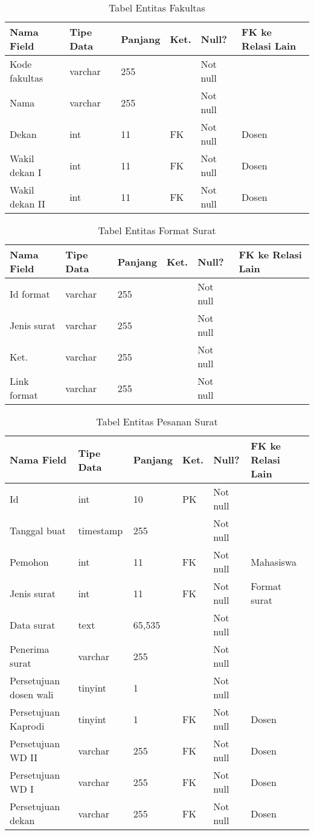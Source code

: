 \begin{table}[H]
\centering
\caption{Tabel Entitas Fakultas}
\label{entitas_fakultas}
\begin{tabular}{|l|l|l|l|l|l|}
\hline
\textbf{Nama Field}&\textbf{Tipe Data}&\textbf{Panjang}&\textbf{Ket.}&\textbf{Null?}&\textbf{FK ke Relasi Lain}\\ \hline
Kode fakultas&varchar&255&&Not null&\\ \hline
Nama&varchar&255&&Not null&\\ \hline
Dekan&int&11&FK&Not null&Dosen\\ \hline
Wakil dekan I&int&11&FK&Not null&Dosen\\ \hline
Wakil dekan II&int&11&FK&Not null&Dosen\\ \hline
\end{tabular}
\end{table}

\begin{table}[H]
\centering
\caption{Tabel Entitas Format Surat}
\label{entitas_format_surat}
\begin{tabular}{|l|l|l|l|l|l|}
\hline
\textbf{Nama Field}&\textbf{Tipe Data}&\textbf{Panjang}&\textbf{Ket.}&\textbf{Null?}&\textbf{FK ke Relasi Lain}\\ \hline
Id format&varchar&255&&Not null&\\ \hline
Jenis surat&varchar&255&&Not null&\\ \hline
Ket.&varchar&255&&Not null&\\ \hline
Link format&varchar&255&&Not null&\\ \hline
\end{tabular}
\end{table}

\begin{table}[H]
\centering
\caption{Tabel Entitas Pesanan Surat}
\label{entitas_pesanan_surat}
\begin{tabular}{|l|l|l|l|l|l|}
\hline
\textbf{Nama Field}&\textbf{Tipe Data}&\textbf{Panjang}&\textbf{Ket.}&\textbf{Null?}&\textbf{FK ke Relasi Lain}\\ \hline
Id&int&10&PK&Not null&\\ \hline
Tanggal buat&timestamp&255&&Not null&\\ \hline
Pemohon&int&11&FK&Not null&Mahasiswa\\ \hline
Jenis surat&int&11&FK&Not null&Format surat\\ \hline
Data surat&text&65,535&&Not null&\\ \hline
Penerima surat&varchar&255&&Not null&\\ \hline
Persetujuan dosen wali&tinyint&1&&Not null&\\ \hline
Persetujuan Kaprodi&tinyint&1&FK&Not null&Dosen\\ \hline
Persetujuan WD II&varchar&255&FK&Not null&Dosen\\ \hline
Persetujuan WD I&varchar&255&FK&Not null&Dosen\\ \hline
Persetujuan dekan&varchar&255&FK&Not null&Dosen\\ \hline
\end{tabular}
\end{table}

